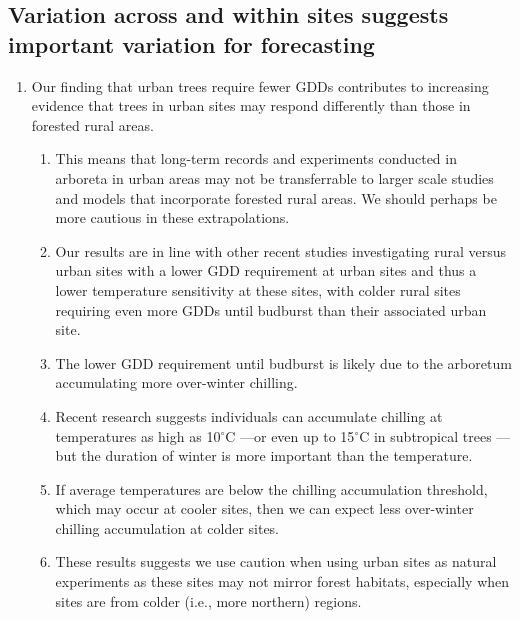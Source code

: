 \documentclass{article}\usepackage[]{graphicx}\usepackage[]{color}
\begin{document}
\begin{enumerate}
\subsection*{Variation across and within sites suggests important variation for forecasting} 
  \begin{enumerate} 
\item Our finding that urban trees require fewer GDDs contributes to increasing evidence that trees in urban sites may respond differently than those in forested rural areas.
  \begin{enumerate} 
  \item This means that long-term records and experiments conducted in arboreta in urban areas may not be transferrable to larger scale studies and models that incorporate forested rural areas. We should perhaps be more cautious in these extrapolations. 
  \item Our results are in line with other recent studies investigating rural versus urban sites with a lower GDD requirement at urban sites and thus a lower temperature sensitivity \citep{Meng2020} at these sites, with colder rural sites requiring even more GDDs until budburst than their associated urban site.
  \item The lower GDD requirement until budburst is likely due to the arboretum accumulating more over-winter chilling. 
  \item Recent research suggests individuals can accumulate chilling at temperatures as high as 10$^{\circ}$C \citep{Baumgarten2021}---or even up to 15$^{\circ}$C in subtropical trees \citep{Zhang2021}---but the duration of winter is more important than the temperature. 
  \item If average temperatures are below the chilling accumulation threshold, which may occur at cooler sites, then we can expect less over-winter chilling accumulation at colder sites.
  \item These results suggests we use caution when using urban sites as natural experiments as these sites may not mirror forest habitats, especially when sites are from colder (i.e., more northern) regions.
  \end{enumerate}
  

\end{enumerate}
\end{enumerate}
\end{document}
